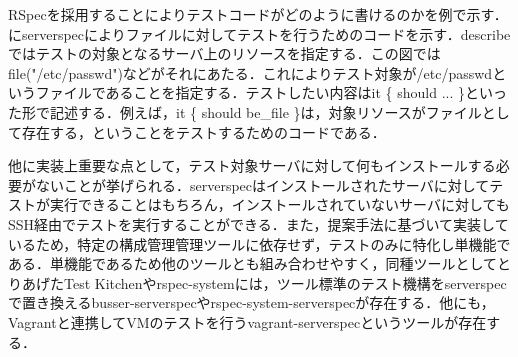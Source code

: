 RSpecを採用することによりテストコードがどのように書けるのかを例で示す．にserverspecによりファイルに対してテストを行うためのコードを示す．describeではテストの対象となるサーバ上のリソースを指定する．この図ではfile("/etc/passwd")などがそれにあたる．これによりテスト対象が/etc/passwdというファイルであることを指定する．テストしたい内容はit \{ should ... \}といった形で記述する．例えば，it \{ should be\_file \}は，対象リソースがファイルとして存在する，ということをテストするためのコードである．

他に実装上重要な点として，テスト対象サーバに対して何もインストールする必要がないことが挙げられる．serverspecはインストールされたサーバに対してテストが実行できることはもちろん，インストールされていないサーバに対してもSSH経由でテストを実行することができる．また，提案手法に基づいて実装しているため，特定の構成管理管理ツールに依存せず，テストのみに特化し単機能である．単機能であるため他のツールとも組み合わせやすく，同種ツールとしてとりあげたTest Kitchenやrspec-systemには，ツール標準のテスト機構をserverspecで置き換えるbusser-serverspec\cite{busser-serverspec}やrspec-system-serverspec\cite{rspec-system-serverspec}が存在する．他にも，Vagrant\cite{vagrant}と連携してVMのテストを行うvagrant-serverspec\cite{vagrant-serverspec}というツールが存在する．
